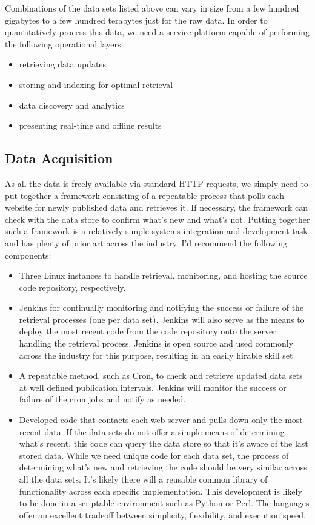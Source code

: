 Combinations of the data sets listed above can vary in size from a few hundred gigabytes to a few hundred terabytes just for the raw data. In order to quantitatively process this data, we need a service platform capable of performing the following operational layers:
\begin{itemize}
	\item retrieving data updates
	\item storing and indexing for optimal retrieval
	\item data discovery and analytics
	\item presenting real-time and offline results
\end{itemize}
\subsection*{Data Acquisition}
As all the data is freely available via standard HTTP requests, we simply need to put together a framework consisting of a repeatable process that polls each website for newly published data and retrieves it. If necessary, the framework can check with the data store to confirm what's new and what's not. Putting together such a framework is a relatively simple systems integration and development task and has plenty of prior art across the industry. I'd recommend the following components:
\begin{itemize}
	\item Three Linux instances to handle retrieval, monitoring, and hosting the source code repository, respectively.
	\item Jenkins for continually monitoring and notifying the success or failure of the retrieval processes (one per data set). Jenkins will also serve as the means to deploy the most recent code from the code repository onto the server handling the retrieval process. Jenkins is open source and used commonly across the industry for this purpose, resulting in an easily hirable skill set \cite{jenkins}
	\item A repeatable method, such as Cron, to check and retrieve updated data sets at well defined publication intervals. Jenkins will monitor the success or failure of the cron jobs and notify as needed.
	\item Developed code that contacts each web server and pulls down only the most recent data. If the data sets do not offer a simple means of determining what's recent, this code can query the data store so that it's aware of the last stored data. While we need unique code for each data set, the process of determining what's new and retrieving the code should be very similar across all the data sets. It's likely there will a reusable common library of functionality across each specific implementation. This development is likely to be done in a scriptable environment such as Python or Perl. The languages offer an excellent tradeoff between simplicity, flexibility, and execution speed.
\end{itemize}

